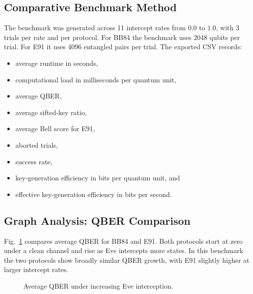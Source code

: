 \documentclass[conference]{IEEEtran}
\begin{document}
\subsection{Comparative Benchmark Method}
The benchmark was generated across 11 intercept rates from $0.0$ to $1.0$, with 3 trials per rate and per protocol. For BB84 the benchmark uses 2048 qubits per trial. For E91 it uses 4096 entangled pairs per trial. The exported CSV records:
\begin{itemize}
\item average runtime in seconds,
\item computational load in milliseconds per quantum unit,
\item average QBER,
\item average sifted-key ratio,
\item average Bell score for E91,
\item aborted trials,
\item success rate,
\item key-generation efficiency in bits per quantum unit, and
\item effective key-generation efficiency in bits per second.
\end{itemize}

\subsection{Graph Analysis: QBER Comparison}
Fig.~\ref{fig:qbercompare} compares average QBER for BB84 and E91. Both protocols start at zero under a clean channel and rise as Eve intercepts more states. In this benchmark the two protocols show broadly similar QBER growth, with E91 slightly higher at larger intercept rates.

\begin{figure}[htbp]
\centering
{}
\caption{Average QBER under increasing Eve interception.}
\label{fig:qbercompare}
\end{figure}
\end{document}
